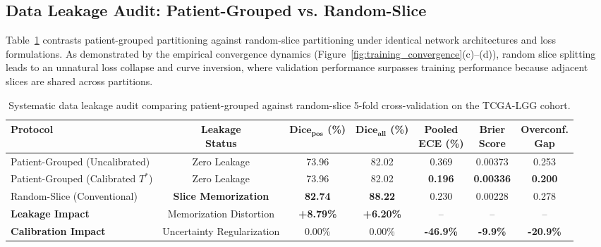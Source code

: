 \documentclass[preprint,3p,times,onecolumn]{elsarticle}
\begin{document}
\subsection{Data Leakage Audit: Patient-Grouped vs. Random-Slice}
\label{sec:leakage_audit}
Table~\ref{tab:leakage_audit} contrasts patient-grouped partitioning against random-slice partitioning under identical network architectures and loss formulations. As demonstrated by the empirical convergence dynamics (Figure~\ref{fig:training_convergence}(c)--(d)), random slice splitting leads to an unnatural loss collapse and curve inversion, where validation performance surpasses training performance because adjacent slices are shared across partitions.

\begin{table}[tbp]
\centering
\caption{Systematic data leakage audit comparing patient-grouped against random-slice 5-fold cross-validation on the TCGA-LGG cohort.}
\label{tab:leakage_audit}
\setlength{\tabcolsep}{3.0pt}
\renewcommand{\arraystretch}{0.96}
\footnotesize
\begin{tabular*}{\textwidth}{@{\extracolsep{\fill}}lcccccc}
\toprule
\textbf{Protocol} & \shortstack{\textbf{Leakage} \\ \textbf{Status}} & \shortstack{$\mathbf{\text{Dice}_{\text{pos}}}$ \\ \textbf{(\%)}} & \shortstack{$\mathbf{\text{Dice}_{\text{all}}}$ \\ \textbf{(\%)}} & \shortstack{\textbf{Pooled} \\ \textbf{ECE (\%)}} & \shortstack{\textbf{Brier} \\ \textbf{Score}} & \shortstack{\textbf{Overconf.} \\ \textbf{Gap}} \\
\midrule
Patient-Grouped (Uncalibrated) & Zero Leakage & 73.96 & 82.02 & 0.369 & 0.00373 & 0.253 \\
Patient-Grouped (Calibrated $T^*$) & Zero Leakage & 73.96 & 82.02 & \textbf{0.196} & \textbf{0.00336} & \textbf{0.200} \\
Random-Slice (Conventional) & \textbf{Slice Memorization} & \textbf{82.74} & \textbf{88.22} & 0.230 & 0.00228 & 0.278 \\
\midrule
\textbf{Leakage Impact} & Memorization Distortion & \textbf{+8.79\%} & \textbf{+6.20\%} & -- & -- & -- \\
\textbf{Calibration Impact} & Uncertainty Regularization & 0.00\% & 0.00\% & \textbf{-46.9\%} & \textbf{-9.9\%} & \textbf{-20.9\%} \\
\bottomrule
\end{tabular*}
\end{table}
\end{document}
